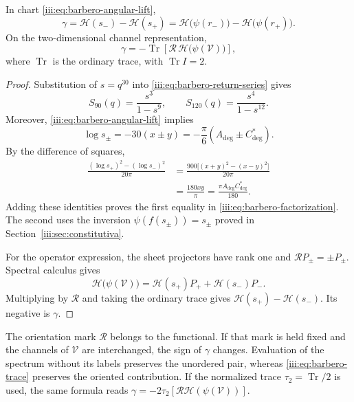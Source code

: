 \begin{theorem}
\label{iii:thm:barbero-factorization}
In chart \eqref{iii:eq:barbero-angular-lift},
\begin{equation}
 \gamma=\mathcal H(s_-)-\mathcal H(s_+)
       =\mathcal H\bigl(\psi(r_-)\bigr)
        -\mathcal H\bigl(\psi(r_+)\bigr).
 \label{iii:eq:barbero-factorization}
\end{equation}
On the two-dimensional channel representation,
\begin{equation}
 \gamma=-\operatorname{Tr}
    \left[\mathcal R\,\mathcal H\bigl(\psi(\mathcal V)\bigr)\right],
 \label{iii:eq:barbero-trace}
\end{equation}
where $\operatorname{Tr}$ is the ordinary trace, with
$\operatorname{Tr}I=2$.
\end{theorem}
\begin{proof}
Substitution of $s=q^{30}$ into \eqref{iii:eq:barbero-return-series} gives
\[
 S_{90}(q)=\frac{s^3}{1-s^9},\qquad
 S_{120}(q)=\frac{s^4}{1-s^{12}}.
\]
Moreover, \eqref{iii:eq:barbero-angular-lift} implies
\[
 \log s_\pm=-30(x\pm y)
 =-\frac\pi6(A_{\deg}\pm C^*_{\deg}).
\]
By the difference of squares,
\begin{align}
 \frac{(\log s_+)^2-(\log s_-)^2}{20\pi}
 &=\frac{900\bigl[(x+y)^2-(x-y)^2\bigr]}{20\pi}\\
 &=\frac{180xy}{\pi}
 =\frac{\pi A_{\deg}C^*_{\deg}}{180}.
 \label{iii:eq:barbero-log-term}
\end{align}
Adding these identities proves the first equality in
\eqref{iii:eq:barbero-factorization}. The second uses the inversion
$\psi(f(s_\pm))=s_\pm$ proved in
Section~\ref{iii:sec:constitutiva}.

For the operator expression, the sheet projectors have rank one and
$\mathcal RP_\pm=\pm P_\pm$. Spectral calculus gives
\[
 \mathcal H\bigl(\psi(\mathcal V)\bigr)
 =\mathcal H(s_+)P_++\mathcal H(s_-)P_-.
\]
Multiplying by $\mathcal R$ and taking the ordinary trace gives
$\mathcal H(s_+)-\mathcal H(s_-)$. Its negative is $\gamma$.
\end{proof}

The orientation mark $\mathcal R$ belongs to the functional. If that
mark is held fixed and the channels of $\mathcal V$ are interchanged,
the sign of $\gamma$ changes. Evaluation of the spectrum without its labels preserves
the unordered pair, whereas \eqref{iii:eq:barbero-trace} preserves the
oriented contribution. If the normalized trace
$\tau_2=\operatorname{Tr}/2$ is used, the same formula reads
$\gamma=-2\tau_2[\mathcal R\mathcal H(\psi(\mathcal V))]$.

